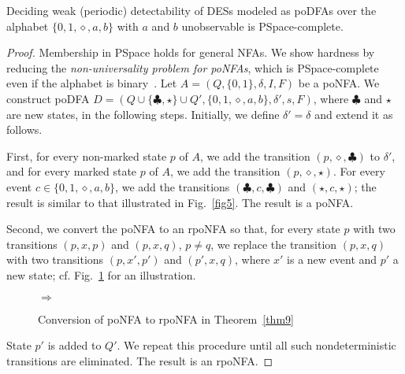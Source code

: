 \documentclass[twocolumn,amsthm]{autartx}
\begin{document}
  \begin{thm}\label{thm9}
    Deciding weak (periodic) detectability of DESs modeled as poDFAs over the alphabet $\{0,1,\diamond,a,b\}$ with $a$ and $b$ unobservable is PSpace-complete.
  \end{thm}
  \begin{proof}
    Membership in PSpace holds for general NFAs. We show hardness by reducing the {\em non-universality problem for poNFAs}, which is PSpace-complete even if the alphabet is binary~\cite{mfcs16:mktmmt_full}. Let $A=(Q,\{0,1\},\delta,I,F)$ be a poNFA. We construct poDFA $D=(Q\cup\{\clubsuit,\star\}\cup Q',\{0,1,\diamond,a,b\},\delta',s,F)$, where $\clubsuit$ and $\star$ are new states, in the following steps. Initially, we define $\delta'=\delta$ and extend it as follows.
    
    First, for every non-marked state $p$ of $A$, we add the transition $(p,\diamond,\clubsuit)$ to $\delta'$, and for every marked state $p$ of $A$, we add the transition $(p,\diamond,\star)$. For every event $c\in\{0,1,\diamond,a,b\}$, we add the transitions $(\clubsuit,c,\clubsuit)$ and $(\star,c,\star)$; the result is similar to that illustrated in Fig.~\ref{fig5}. The result is a poNFA.
    
    Second, we convert the poNFA to an rpoNFA so that, for every state $p$ with two transitions $(p,x,p)$ and $(p,x,q)$, $p\neq q$, we replace the transition $(p,x,q)$ with two transitions $(p,x',p')$ and $(p',x,q)$, where $x'$ is a new event and $p'$ a new state; cf. Fig.~\ref{fig3} for an illustration. 
    \begin{figure}
      \centering
      \quad $\Longrightarrow$ \quad
      \caption{Conversion of poNFA to rpoNFA in Theorem~\ref{thm9}}
      \label{fig3}
    \end{figure}
    State $p'$ is added to $Q'$. We repeat this procedure until all such nondeterministic transitions are eliminated. The result is an rpoNFA.


\end{proof}
\end{document}
